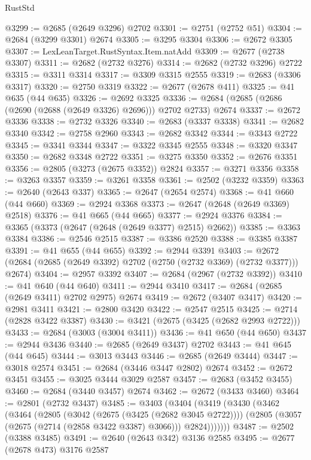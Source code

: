 \begin{lexlean}{RustStd}
\begin{coremodule}
@3299 := @2685 (@2649 @3296) @2702
@3301 := @2751 (@2752 @51)
@3304 := @2684 (@3299 @3301) @2674
@3305 := @3295 @3304
@3306 := @2672 @3305
@3307 := LexLeanTarget.RustSyntax.Item.natAdd
@3309 := @2677 (@2738 @3307)
@3311 := @2682 (@2732 @3276)
@3314 := @2682 (@2732 @3296) @2722
@3315 := @3311 @3314
@3317 := @3309 @3315 @2555
@3319 := @2683 (@3306 @3317)
@3320 := @2750 @3319
@3322 := @2677 (@2678 @411)
@3325 := @41 @635 (@44 @635)
@3326 := @2692 @3325
@3336 := @2684 (@2685 (@2686 (@2690 (@2688 (@2649 @3326) @2696))) @2702 @2733) @2674
@3337 := @2672 @3336
@3338 := @2732 @3326
@3340 := @2683 (@3337 @3338)
@3341 := @2682 @3340
@3342 := @2758 @2960
@3343 := @2682 @3342
@3344 := @3343 @2722
@3345 := @3341 @3344
@3347 := @3322 @3345 @2555
@3348 := @3320 @3347
@3350 := @2682 @3348 @2722
@3351 := @3275 @3350
@3352 := @2676 @3351
@3356 := @2805 (@3273 (@2675 @3352)) @2824
@3357 := @3271 @3356
@3358 := @3263 @3357
@3359 := @3261 @3358
@3361 := @2502 (@3232 @3359)
@3363 := @2640 (@2643 @337)
@3365 := @2647 (@2654 @2574)
@3368 := @41 @660 (@44 @660)
@3369 := @2924 @3368
@3373 := @2647 (@2648 (@2649 @3369) @2518)
@3376 := @41 @665 (@44 @665)
@3377 := @2924 @3376
@3384 := @3365 (@3373 (@2647 (@2648 (@2649 @3377) @2515) @2662))
@3385 := @3363 @3384
@3386 := @2546 @2515
@3387 := @3386 @2520
@3388 := @3385 @3387
@3391 := @41 @655 (@44 @655)
@3392 := @2944 @3391
@3403 := @2672 (@2684 (@2685 (@2649 @3392) @2702 (@2750 (@2732 @3369) (@2732 @3377))) @2674)
@3404 := @2957 @3392
@3407 := @2684 (@2967 (@2732 @3392))
@3410 := @41 @640 (@44 @640)
@3411 := @2944 @3410
@3417 := @2684 (@2685 (@2649 @3411) @2702 @2975) @2674
@3419 := @2672 (@3407 @3417)
@3420 := @2981 @3411
@3421 := @2800 @3420
@3422 := @2547 @2515
@3425 := @2714 (@2828 @3422 @3387)
@3430 := @3421 (@2675 (@3425 (@2682 @2993 @2722)))
@3433 := @2684 (@3003 (@3004 @3411))
@3436 := @41 @650 (@44 @650)
@3437 := @2944 @3436
@3440 := @2685 (@2649 @3437) @2702
@3443 := @41 @645 (@44 @645)
@3444 := @3013 @3443
@3446 := @2685 (@2649 @3444)
@3447 := @3018 @2574
@3451 := @2684 (@3446 @3447 @2802) @2674
@3452 := @2672 @3451
@3455 := @3025 @3444 @3029 @2587
@3457 := @2683 (@3452 @3455)
@3460 := @2684 (@3440 @3457) @2674
@3462 := @2672 (@3433 @3460)
@3464 := @2801 (@2732 @3437)
@3485 := @3403
    (@3404
      (@3419
        (@3430
          (@3462
            (@3464
              (@2805
                (@3042 (@2675 (@3425 (@2682 @3045 @2722))))
                (@2805 (@3057 (@2675 (@2714 (@2858 @3422 @3387) @3066))) @2824)))))))
@3487 := @2502 (@3388 @3485)
@3491 := @2640 (@2643 @342) @3136 @2585
@3495 := @2677 (@2678 @473) @3176 @2587

\end{coremodule}
\end{lexlean}
